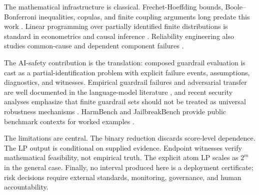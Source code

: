 The mathematical infrastructure is classical. Frechet-Hoeffding bounds,
Boole--Bonferroni inequalities, copulas, and finite coupling arguments long
predate this work \cite{frechet1951,hoeffding1940,boole1854,bonferroni1936,sklar1959,joe1997,nelsen2006}.
Linear programming over partially identified finite distributions is standard
in econometrics and causal inference \cite{manski1990,balke1994,tamer2010,beresteanu2008}.
Reliability engineering also studies common-cause and dependent component
failures \cite{mosleh1998}.

The AI-safety contribution is the translation: composed guardrail evaluation is
cast as a partial-identification problem with explicit failure events,
assumptions, diagnostics, and witnesses. Empirical guardrail failures and
adversarial transfer are well documented in the language-model literature
\cite{wei2023,zou2023,perez2022}, and recent security analyses emphasize that
finite guardrail sets should not be treated as universal robustness mechanisms
\cite{vassilev2026}. HarmBench and JailbreakBench provide public benchmark
contexts for worked examples \cite{mazeika2024harmbench,chao2024jailbreakbench}.

The limitations are central. The binary reduction discards score-level
dependence. The LP output is conditional on supplied evidence. Endpoint
witnesses verify mathematical feasibility, not empirical truth. The explicit
atom LP scales as $2^m$ in the general case. Finally, no interval produced here
is a deployment certificate; risk decisions require external standards,
monitoring, governance, and human accountability.
